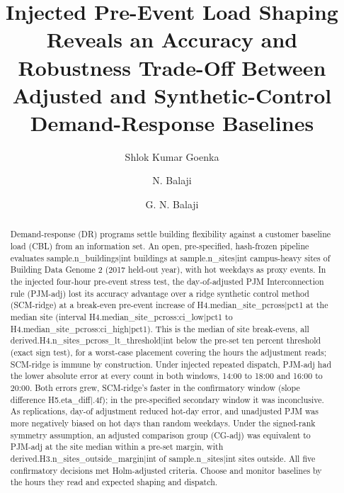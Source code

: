 \begin{frontmatter}

\title{Injected Pre-Event Load Shaping Reveals an Accuracy and Robustness Trade-Off Between Adjusted and Synthetic-Control Demand-Response Baselines}

\author[vit]{Shlok Kumar Goenka}
\author[vit]{N. Balaji}
\author[vit]{G. N. Balaji}
\address[vit]{School of Computer Science and Engineering, Vellore Institute of Technology, Vellore, 632014, Tamil Nadu, India}

\begin{abstract}
Demand-response (DR) programs settle building flexibility against a customer baseline load (CBL) from an information set. An open, pre-specified, hash-frozen pipeline evaluates {{sample.n_buildings|int}} buildings at {{sample.n_sites|int}} campus-heavy sites of Building Data Genome 2 (2017 held-out year), with hot weekdays as proxy events. In the injected four-hour pre-event stress test, the day-of-adjusted PJM Interconnection rule (PJM-adj) lost its accuracy advantage over a ridge synthetic control method (SCM-ridge) at a break-even pre-event increase of {{H4.median_site_pcross|pct1}} at the median site (interval {{H4.median_site_pcross:ci_low|pct1}} to {{H4.median_site_pcross:ci_high|pct1}}). This is the median of site break-evens, all {{derived.H4.n_sites_pcross_lt_threshold|int}} below the pre-set ten percent threshold (exact sign test), for a worst-case placement covering the hours the adjustment reads; SCM-ridge is immune by construction. Under injected repeated dispatch, PJM-adj had the lower absolute error at every count in both windows, 14:00 to 18:00 and 16:00 to 20:00. Both errors grew, SCM-ridge's faster in the confirmatory window (slope difference {{H5.eta_diff|.4f}}); in the pre-specified secondary window it was inconclusive. As replications, day-of adjustment reduced hot-day error, and unadjusted PJM was more negatively biased on hot days than random weekdays. Under the signed-rank symmetry assumption, an adjusted comparison group (CG-adj) was equivalent to PJM-adj at the site median within a pre-set margin, with {{derived.H3.n_sites_outside_margin|int}} of {{sample.n_sites|int}} sites outside. All five confirmatory decisions met Holm-adjusted criteria. Choose and monitor baselines by the hours they read and expected shaping and dispatch.
\end{abstract}


\end{frontmatter}
